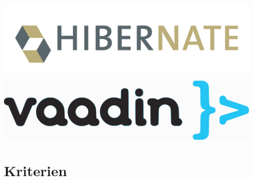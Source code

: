 \begin{frame}
	\includegraphics[width=\linewidth]{images/hibernate-logo.png}
\end{frame}

\begin{frame}
	\includegraphics[width=\linewidth]{images/vaadin-logo.png}
\end{frame}



\section{Kriterien}

